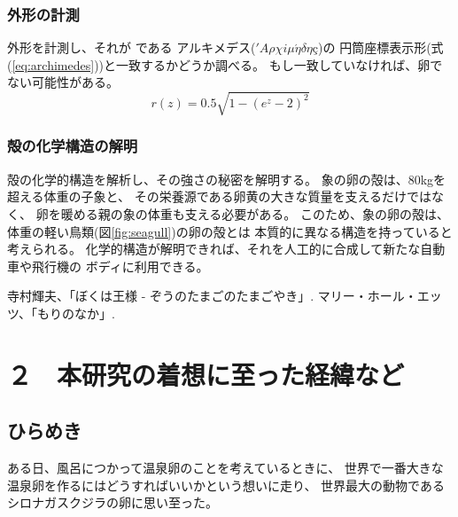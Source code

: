 \documentclass[11pt,a4j,dvipdfmx]{jarticle} 					%
\newcommand{\研究課題名}{象の卵}
\newcommand{\研究機関名}{逢坂大学}
\newcommand{\研究代表者氏名}{湯川秀樹}
\newcommand{\研究期間の最終元号年度}{6}  %
\begin{document}
\subsubsection{外形の計測}
        外形を計測し、それが
        である
        アルキメデス(\('A\rho\chi i\mu\acute{\eta}\delta\eta\mbox{\c{c}}\))の
        円筒座標表示形(式(\ref{eq:archimedes}))と一致するかどうか調べる。
        もし一致していなければ、卵でない可能性がある。
        \begin{equation}
        	\label{eq:archimedes}
        	r(z) = 0.5\sqrt{1-(e^z-2)^2}
        \end{equation}

\subsubsection{殻の化学構造の解明}
	殻の化学的構造を解析し、その強さの秘密を解明する。
	象の卵の殻は、80kgを超える体重の子象と、
	その栄養源である卵黄の大きな質量を支えるだけではなく、
	卵を暖める親の象の体重も支える必要がある。
	このため、象の卵の殻は、体重の軽い鳥類(図\ref{fig:seagull})の卵の殻とは
	本質的に異なる構造を持っていると考えられる。
	化学的構造が解明できれば、それを人工的に合成して新たな自動車や飛行機の
	ボディに利用できる。

\vspace*{1zw}
\begin{thebibliography}{99}
	 寺村輝夫、「ぼくは王様 - ぞうのたまごのたまごやき」.
	 マリー・ホール・エッツ、「もりのなか」.
\end{thebibliography}




\section{２　本研究の着想に至った経緯など}

\vspace*{-8mm}
\subsection{ひらめき}
ある日、風呂につかって温泉卵のことを考えているときに、
世界で一番大きな温泉卵を作るにはどうすればいいかという想いに走り、
世界最大の動物であるシロナガスクジラの卵に思い至った。
\end{document}
